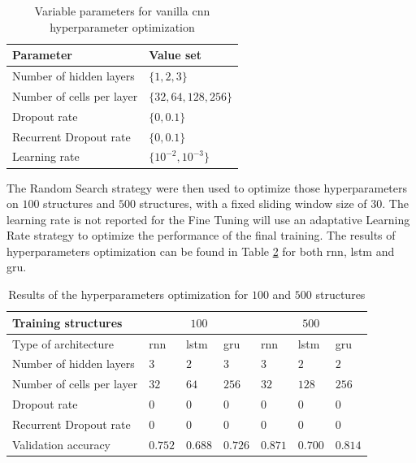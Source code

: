 \documentclass[conference]{IEEEtran}
\begin{document}
\begin{table}[htp]
	\centering
	\caption{Variable parameters for vanilla \gls{cnn} hyperparameter optimization}
	\label{tab:variable_parameters_rnn_optimization}
	\begin{tabular}{ll}
		\textbf{Parameter} & \textbf{Value set} \\
		\hline
		Number of hidden layers & $ \{1, 2, 3\} $ \\
		Number of cells per layer & $ \{32, 64, 128, 256\} $ \\
		Dropout rate & $ \{0, 0.1\} $ \\
		Recurrent Dropout rate & $ \{0, 0.1\} $ \\
		Learning rate & $ \{10^{-2}, 10^{-3}\} $
	\end{tabular}
\end{table}

The Random Search strategy were then used to optimize those hyperparameters on $ 100 $ structures and $ 500 $ structures, with a fixed sliding window size of $30$. The learning rate is not reported for the Fine Tuning will use an adaptative Learning Rate strategy to optimize the performance of the final training. The results of hyperparameters optimization can be found in Table \ref{tab:results_parameters_rnn_optimization} for both \gls{rnn}, \gls{lstm} and \gls{gru}.



\begin{table}[htp]
	\centering
	\caption{Results of the hyperparameters optimization for $ 100 $ and $ 500 $ structures}
	\label{tab:results_parameters_rnn_optimization}
	\begin{tabular}{p{2.5cm}|lll|lll}
		Training structures & \multicolumn{3}{c}{$ 100 $} & \multicolumn{3}{c}{$ 500 $} \\
		\hline
		Type of architecture & \gls{rnn} & \gls{lstm} & \gls{gru} & \gls{rnn} & \gls{lstm} & \gls{gru}\\
		\hline
		Number of hidden layers & $3$ & $2$ & $3$ & $3$ & $2$ & $2$ \\
		Number of cells per layer & $32$ & $64$ & $256$ & $32$ & $128$ & $256$ \\
		Dropout rate & $0$ & $0$ & $0$ & $0$ & $0$ & $0$ \\
		Recurrent Dropout rate & $0$ & $0$ & $0$& $0$ & $0$ & $0$ \\
		\hline
		Validation accuracy & $0.752$ & $0.688$ & $0.726$ & $0.871$ & $0.700$ & $0.814$
	\end{tabular}
\end{table}
\end{document}
